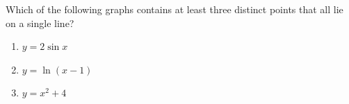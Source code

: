 Which of the following graphs contains at least three distinct points that all lie on a single line?
\begin{enumerate}
\item[A.] $y=2\sin x$
\item[B.] $y=\ln(x-1)$
\item[C.] $y=x^2+4$
\end{enumerate}
